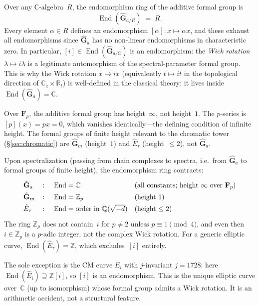 \documentclass[11pt]{article}
\newcommand{\C}{\mathbb{C}}
\newcommand{\Z}{\mathbb{Z}}
\newcommand{\Q}{\mathbb{Q}}
\newcommand{\bR}{\mathbb{R}}
\newcommand{\End}{\operatorname{End}}
\begin{document}
\begin{observation}
\label{obs:end-additive}
Over any $\C$-algebra~$R$, the endomorphism ring of the additive
formal group is
\[
\End(\hat{\mathbf{G}}_{a/R}) \;=\; R.
\]
Every element $\alpha \in R$ defines an endomorphism
$[\alpha]\colon x \mapsto \alpha x$, and these exhaust all
endomorphisms since $\hat{\mathbf{G}}_a$ has no non-linear
endomorphisms in characteristic zero.  In particular,
$[i] \in \End(\hat{\mathbf{G}}_{a/\C})$ is an endomorphism: the
\emph{Wick rotation} $\lambda \mapsto i\lambda$ is a legitimate
automorphism of the spectral-parameter formal group.  This is why
the Wick rotation $x \mapsto ix$ (equivalently $t \mapsto it$
in the topological direction of $\C_z \times \bR_t$) is
well-defined in the classical theory: it lives inside
$\End(\hat{\mathbf{G}}_a) = \C$.
\end{observation}

\begin{remark}
\label{rem:height-additive}
Over $\mathbf{F}_p$, the additive formal group has
height~$\infty$, not height~$1$.  The $p$-series is
$[p](x) = px = 0$, which vanishes identically---the defining
condition of infinite height.  The formal groups of finite height
relevant to the chromatic tower
(\S\ref{sec:chromatic}) are $\hat{\mathbf{G}}_m$ (height~$1$)
and $\hat{E}_\tau$ (height~$\leq 2$), not $\hat{\mathbf{G}}_a$.
\end{remark}

\begin{observation}
\label{obs:spectralization-contraction}
Upon spectralization (passing from chain complexes to spectra, i.e.\
from $\hat{\mathbf{G}}_a$ to formal groups of finite height), the
endomorphism ring contracts:
\[
\renewcommand{\arraystretch}{1.4}
\begin{array}{@{}lcll@{}}
\hat{\mathbf{G}}_a & \colon &
  \End = \C & \text{(all constants; height $\infty$ over $\mathbf{F}_p$)} \\
\hat{\mathbf{G}}_m & \colon &
  \End = \Z_p & \text{(height $1$)} \\
\hat{E}_\tau & \colon &
  \End = \text{order in } \Q(\sqrt{-d})
  & \text{(height $\leq 2$)}
\end{array}
\]
The ring $\Z_p$ does not contain~$i$ for $p \neq 2$ unless
$p \equiv 1 \pmod{4}$, and even then $i \in \Z_p$ is a
$p$-adic integer, not the complex Wick rotation.  For a generic
elliptic curve, $\End(\hat{E}_\tau) = \Z$, which excludes~$[i]$
entirely.

The sole exception is the CM curve $E_i$ with $j$-invariant
$j = 1728$: here $\End(\hat{E}_i) \supseteq \Z[i]$, so $[i]$ is
an endomorphism.  This is the unique elliptic curve over~$\C$ (up
to isomorphism) whose formal group admits a Wick rotation.  It is
an arithmetic accident, not a structural feature.
\end{observation}
\end{document}

